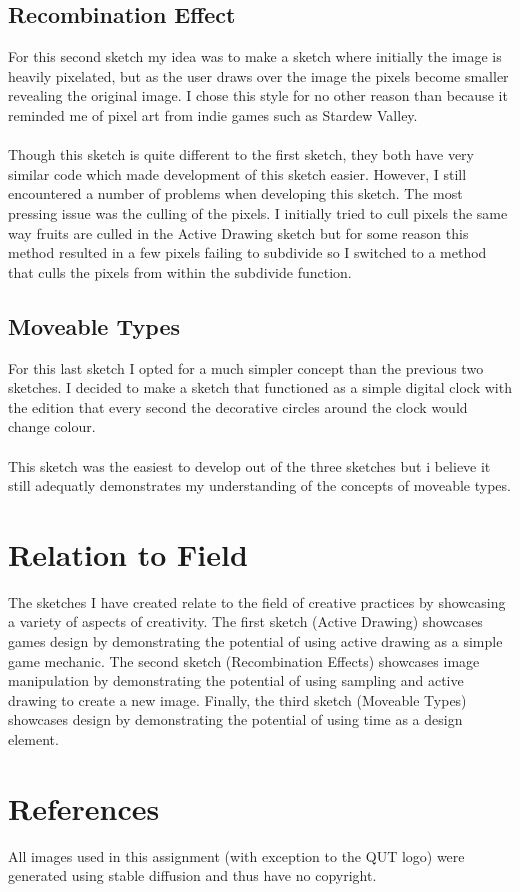 \documentclass[12pt,a4paper]{article}
\begin{document}
		\subsection{Recombination Effect}
			For this second sketch my idea was to make a sketch where initially the image is heavily 
			pixelated, but as the user draws over the image the pixels become smaller revealing the 
			original image. I chose this style for no other reason than because it reminded me of pixel
			art from indie games such as Stardew Valley.\\\\Though this sketch is quite different to the 
			first sketch, they both have very similar code which made development of this sketch easier.
			However, I still encountered a number of problems when developing this sketch. The most 
			pressing issue was the culling of the pixels. I initially tried to cull pixels the same 
			way fruits are culled in the Active Drawing sketch but for some reason this method resulted 
			in a few pixels failing to subdivide so I switched to a method that culls the pixels from 
			within the subdivide function.

		\subsection{Moveable Types}
			For this last sketch I opted for a much simpler concept than the previous two sketches.
			I decided to make a sketch that functioned as a simple digital clock with the edition 
			that every second the decorative circles around the clock would change colour.\\\\This 
			sketch was the easiest to develop out of the three sketches but i believe it still
			adequatly demonstrates my understanding of the concepts of moveable types.
	
	\section{Relation to Field}
		The sketches I have created relate to the field of creative practices by showcasing a variety
		of aspects of creativity. The first sketch (Active Drawing) showcases games design by demonstrating
		the potential of using active drawing as a simple game mechanic. The second sketch (Recombination 
		Effects) showcases image manipulation by demonstrating the potential of using sampling and active 
		drawing to create a new image. Finally, the third sketch (Moveable Types) showcases design by 
		demonstrating the potential of using time as a design element.
	
	\section{References}
	All images used in this assignment (with exception to the QUT logo) were generated using stable diffusion 
	and thus have no copyright.
\end{document}
